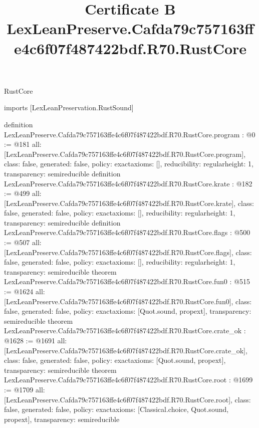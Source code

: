 \begin{lexlean}{RustCore}
\title{Certificate B LexLeanPreserve.Cafda79c757163ffe4c6f07f487422bdf.R70.RustCore}
\begin{coremodule}
imports [LexLeanPreservation.RustSound]

definition LexLeanPreserve.Cafda79c757163ffe4c6f07f487422bdf.R70.RustCore.program : @0 := @181 {
  all: [LexLeanPreserve.Cafda79c757163ffe4c6f07f487422bdf.R70.RustCore.program],
  class: false,
  generated: false,
  policy: exact{axioms: []},
  reducibility: regular{height: 1},
  transparency: semireducible
}
definition LexLeanPreserve.Cafda79c757163ffe4c6f07f487422bdf.R70.RustCore.krate : @182 := @499 {
  all: [LexLeanPreserve.Cafda79c757163ffe4c6f07f487422bdf.R70.RustCore.krate],
  class: false,
  generated: false,
  policy: exact{axioms: []},
  reducibility: regular{height: 1},
  transparency: semireducible
}
definition LexLeanPreserve.Cafda79c757163ffe4c6f07f487422bdf.R70.RustCore.flags : @500 := @507 {
  all: [LexLeanPreserve.Cafda79c757163ffe4c6f07f487422bdf.R70.RustCore.flags],
  class: false,
  generated: false,
  policy: exact{axioms: []},
  reducibility: regular{height: 1},
  transparency: semireducible
}
theorem LexLeanPreserve.Cafda79c757163ffe4c6f07f487422bdf.R70.RustCore.fun0 : @515 := @1624 {
  all: [LexLeanPreserve.Cafda79c757163ffe4c6f07f487422bdf.R70.RustCore.fun0],
  class: false,
  generated: false,
  policy: exact{axioms: [Quot.sound, propext]},
  transparency: semireducible
}
theorem LexLeanPreserve.Cafda79c757163ffe4c6f07f487422bdf.R70.RustCore.crate_ok : @1628 := @1691 {
  all: [LexLeanPreserve.Cafda79c757163ffe4c6f07f487422bdf.R70.RustCore.crate_ok],
  class: false,
  generated: false,
  policy: exact{axioms: [Quot.sound, propext]},
  transparency: semireducible
}
theorem LexLeanPreserve.Cafda79c757163ffe4c6f07f487422bdf.R70.RustCore.root : @1699 := @1709 {
  all: [LexLeanPreserve.Cafda79c757163ffe4c6f07f487422bdf.R70.RustCore.root],
  class: false,
  generated: false,
  policy: exact{axioms: [Classical.choice, Quot.sound, propext]},
  transparency: semireducible
}


\end{coremodule}
\end{lexlean}
